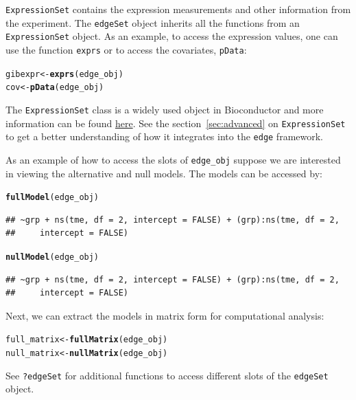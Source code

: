 \documentclass{article}\usepackage[]{graphicx}\usepackage[]{color}
\makeatletter
\newcommand{\hlstd}[1]{\textcolor[rgb]{0.345,0.345,0.345}{#1}}%
\newcommand{\hlkwb}[1]{\textcolor[rgb]{0.69,0.353,0.396}{#1}}%
\newcommand{\hlkwd}[1]{\textcolor[rgb]{0.737,0.353,0.396}{\textbf{#1}}}%
\newenvironment{kframe}{%
 \def\at@end@of@kframe{}%
 \ifinner\ifhmode%
  \def\at@end@of@kframe{\end{minipage}}%
  \begin{minipage}{\columnwidth}%
 \fi\fi%
 \def\FrameCommand##1{\hskip\@totalleftmargin \hskip-\fboxsep
 \colorbox{shadecolor}{##1}\hskip-\fboxsep
     \hskip-\linewidth \hskip-\@totalleftmargin \hskip\columnwidth}%
 \MakeFramed {\advance\hsize-\width
   \@totalleftmargin\z@ \linewidth\hsize
   \@setminipage}}%
 {\par\unskip\endMakeFramed%
 \at@end@of@kframe}
\newenvironment{knitrout}{}{} %
\makeatother
\begin{document}
{\tt ExpressionSet} contains the expression measurements and other information from the experiment. The {\tt edgeSet} object inherits all the functions from an {\tt ExpressionSet} object. As an example, to access the expression values, one can use the function {\tt exprs} or to access the covariates, {\tt pData}:
\begin{knitrout}
\color{fgcolor}\begin{kframe}
\begin{alltt}
\hlstd{gibexpr} \hlkwb{<-} \hlkwd{exprs}\hlstd{(edge_obj)}
\hlstd{cov} \hlkwb{<-} \hlkwd{pData}\hlstd{(edge_obj)}
\end{alltt}
\end{kframe}
\end{knitrout}
The {\tt ExpressionSet} class is a widely used object in Bioconductor and more information can be found \href{http://www.bioconductor.org/packages/2.14/bioc/html/Biobase.html}{here}. See the section~\ref{sec:advanced} on {\tt ExpressionSet} to get a better understanding of how it integrates into the {\tt edge} framework.

As an example of how to access the slots of {\tt edge\_obj} suppose we are interested in viewing the alternative and null models. The models can be accessed by:
\begin{knitrout}
\color{fgcolor}\begin{kframe}
\begin{alltt}
\hlkwd{fullModel}\hlstd{(edge_obj)}
\end{alltt}
\begin{verbatim}
## ~grp + ns(tme, df = 2, intercept = FALSE) + (grp):ns(tme, df = 2, 
##     intercept = FALSE)
\end{verbatim}
\begin{alltt}
\hlkwd{nullModel}\hlstd{(edge_obj)}
\end{alltt}
\begin{verbatim}
## ~grp + ns(tme, df = 2, intercept = FALSE) + (grp):ns(tme, df = 2, 
##     intercept = FALSE)
\end{verbatim}
\end{kframe}
\end{knitrout}
Next, we can extract the models in matrix form for computational analysis:
\begin{knitrout}
\color{fgcolor}\begin{kframe}
\begin{alltt}
\hlstd{full_matrix} \hlkwb{<-} \hlkwd{fullMatrix}\hlstd{(edge_obj)}
\hlstd{null_matrix} \hlkwb{<-} \hlkwd{nullMatrix}\hlstd{(edge_obj)}
\end{alltt}
\end{kframe}
\end{knitrout}
See {\tt ?edgeSet} for additional functions to access different slots of the {\tt edgeSet} object. 
\end{document}
